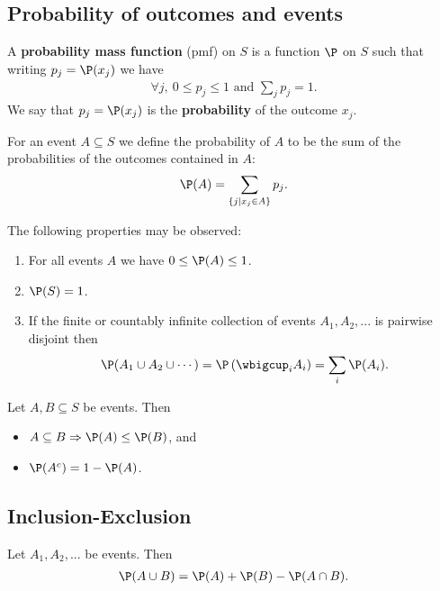 \documentclass{article}
\begin{document}
\subsection{Probability of outcomes and events}
\begin{definition}
	A \textbf{probability mass function} (pmf) on $S$ is a function $\P$ on $S$ such that writing $p_j=\P(x_j)$ we have
	\begin{align*}
		\forall j,\:0 \leq p_j \leq 1 \text{ and } \sum_j p_j = 1.
	\end{align*}
	We say that $p_j=\P(x_j)$ is the \textbf{probability} of the outcome $x_j$.
\end{definition}
\begin{definition}
	For an event $A\subseteq S$ we define the probability of $A$ to be the sum of the probabilities of the outcomes contained in
	$A$:
	\begin{align*}
		\P(A) = \sum_{\{j | x_j \in A\}} p_j.
	\end{align*}
\end{definition}
\begin{theorem}
	The following properties may be observed:
	\begin{enumerate}
		\item For all events $A$ we have $0\leq \P(A) \leq 1$.
		\item $\P(S)=1$.
		\item If the finite or countably infinite collection of events $A_1, A_2, ...$ is pairwise disjoint then
		      \begin{align*}
			      \P(A_1 \cup A_2 \cup \cdots) = \P\left(\wbigcup_i A_i\right) = \sum_i \P(A_i).
		      \end{align*}
	\end{enumerate}
\end{theorem}
\begin{theorem}
	Let $A,B\subseteq S$ be events. Then
	\begin{itemize}
		\item $A \subseteq B \Rightarrow \P(A) \leq \P(B)$, and
		\item $\P(A^c) = 1 - \P(A)$.
	\end{itemize}
\end{theorem}
\subsection{Inclusion-Exclusion}
\begin{theorem}
	Let $A_1, A_2, ...$ be events. Then
	\begin{align*}
		\P(A\cup B)=\P(A) + \P(B) - \P(A\cap B).
	\end{align*}
\end{theorem}
\end{document}
